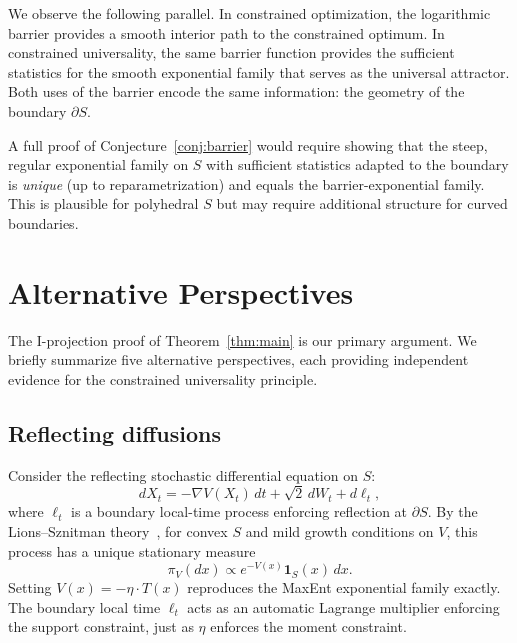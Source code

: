 \documentclass[aps,pre,twocolumn,superscriptaddress,nofootinbib]{revtex4-2}
\theoremstyle{definition}
\theoremstyle{remark}
\begin{document}
We observe the following parallel.  In constrained optimization, the
logarithmic barrier provides a smooth interior path to the constrained optimum.
In constrained universality, the same barrier function provides the sufficient
statistics for the smooth exponential family that serves as the universal
attractor.  Both uses of the barrier encode the same information: the geometry
of the boundary $\partial S$.

A full proof of Conjecture~\ref{conj:barrier} would require showing that the
steep, regular exponential family on $S$ with sufficient statistics adapted to
the boundary is \emph{unique} (up to reparametrization) and equals the
barrier-exponential family.  This is plausible for polyhedral $S$ but may
require additional structure for curved boundaries.

\section{Alternative Perspectives}\label{sec:alt}

The I-projection proof of Theorem~\ref{thm:main} is our primary argument.  We
briefly summarize five alternative perspectives, each providing independent
evidence for the constrained universality principle.

\subsection{Reflecting diffusions}\label{sec:rsde}

Consider the reflecting stochastic differential equation on $S$:
\begin{equation}\label{eq:rsde}
dX_t=-\nabla V(X_t)\,dt+\sqrt{2}\,dW_t+d\ell_t,
\end{equation}
where $\ell_t$ is a boundary local-time process enforcing reflection at
$\partial S$.  By the Lions--Sznitman theory~\cite{LionsSznitman1984}, for
convex $S$ and mild growth conditions on $V$, this process has a unique
stationary measure
\begin{equation}
\pi_V(dx)\propto e^{-V(x)}\mathbf{1}_S(x)\,dx.
\end{equation}
Setting $V(x)=-\eta\cdot T(x)$ reproduces the MaxEnt exponential family
exactly.  The boundary local time $\ell_t$ acts as an automatic Lagrange
multiplier enforcing the support constraint, just as $\eta$ enforces the
moment constraint.
\end{document}
